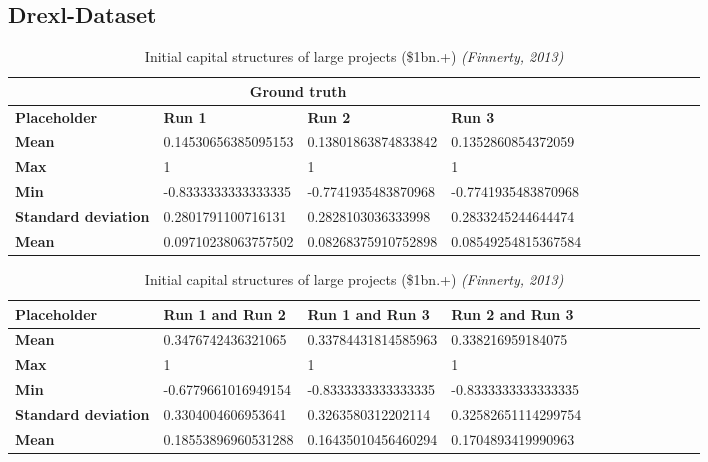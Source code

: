 \subsection{Drexl-Dataset}

\begin{table}[h]
    \centering
    \begin{tabular}{@{}llllllllllll@{}}\toprule
        \multicolumn{4}{c}{\textbf{Ground truth}} \\
        \toprule
        \textbf{Placeholder}  & \textbf{Run 1} & \textbf{Run 2} & \textbf{Run 3}\\ 
        \midrule
        \textbf{Mean} & 0.14530656385095153  & 0.13801863874833842 & 0.1352860854372059 \\
        \hdashline
        \textbf{Max} & 1 & 1 & 1 \\
        \hdashline
        \textbf{Min} & -0.8333333333333335 & -0.7741935483870968 & -0.7741935483870968 \\
        \hdashline
        \textbf{Standard deviation} & 0.2801791100716131 & 0.2828103036333998 & 0.2833245244644474 \\
        \hdashline
        \textbf{Mean} & 0.09710238063757502 & 0.08268375910752898 & 0.08549254815367584 \\
        \bottomrule
    \end{tabular}
    \caption{Initial capital structures of large projects (\$1bn.+) \emph{(Finnerty, 2013)}}
\end{table}

\begin{table}[h]
    \centering
    \begin{tabular}{@{}llllllllllll@{}}\toprule
        \textbf{Placeholder}  & \textbf{Run 1 and Run 2} & \textbf{Run 1 and Run 3} & \textbf{Run 2 and Run 3}\\ 
        \midrule
        \textbf{Mean} & 0.3476742436321065  & 0.33784431814585963 & 0.338216959184075 \\
        \hdashline
        \textbf{Max} & 1 & 1 & 1 \\
        \hdashline
        \textbf{Min} & -0.6779661016949154 & -0.8333333333333335 & -0.8333333333333335 \\
        \hdashline
        \textbf{Standard deviation} & 0.3304004606953641 & 0.3263580312202114 & 0.32582651114299754 \\
        \hdashline
        \textbf{Mean} & 0.18553896960531288 & 0.16435010456460294 & 0.1704893419990963 \\
        \bottomrule
    \end{tabular}
    \caption{Initial capital structures of large projects (\$1bn.+) \emph{(Finnerty, 2013)}}
\end{table}


